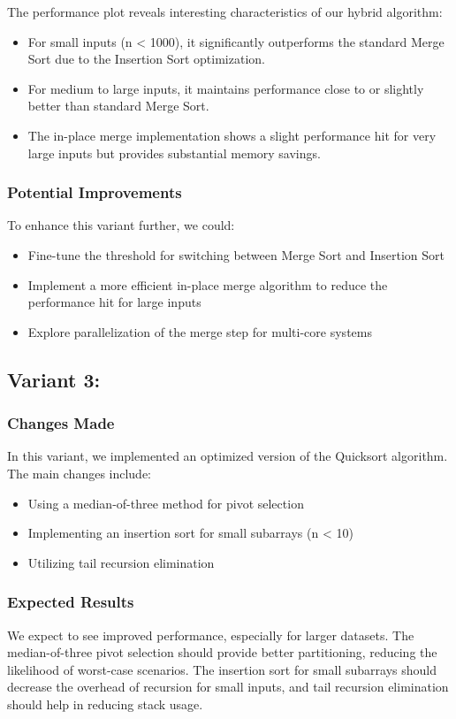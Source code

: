 \documentclass[twocolumn]{article}
\begin{document}
The performance plot reveals interesting characteristics of our hybrid algorithm:
\begin{itemize}
    \item For small inputs (n < 1000), it significantly outperforms the standard Merge Sort due to the Insertion Sort optimization.
    \item For medium to large inputs, it maintains performance close to or slightly better than standard Merge Sort.
    \item The in-place merge implementation shows a slight performance hit for very large inputs but provides substantial memory savings.
\end{itemize}

\subsubsection{Potential Improvements}
To enhance this variant further, we could:
\begin{itemize}
    \item Fine-tune the threshold for switching between Merge Sort and Insertion Sort
    \item Implement a more efficient in-place merge algorithm to reduce the performance hit for large inputs
    \item Explore parallelization of the merge step for multi-core systems
\end{itemize}
\subsection{Variant 3: }

\subsubsection{Changes Made}
In this variant, we implemented an optimized version of the Quicksort algorithm. The main changes include:
\begin{itemize}
    \item Using a median-of-three method for pivot selection
    \item Implementing an insertion sort for small subarrays (n < 10)
    \item Utilizing tail recursion elimination
\end{itemize}

\subsubsection{Expected Results}
We expect to see improved performance, especially for larger datasets. The median-of-three pivot selection should provide better partitioning, reducing the likelihood of worst-case scenarios. The insertion sort for small subarrays should decrease the overhead of recursion for small inputs, and tail recursion elimination should help in reducing stack usage.
\end{document}
